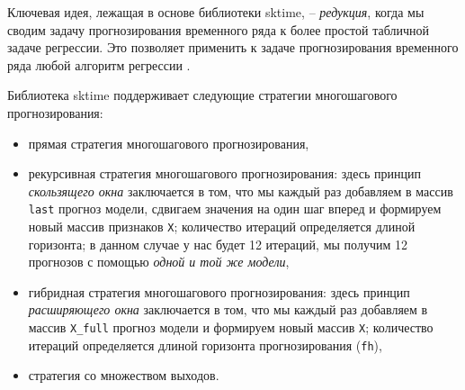 \documentclass[%
	11pt,
	a4paper,
	utf8,
		]{article}
\begin{document}
Ключевая идея, лежащая в основе библиотеки sktime, -- \emph{редукция}, когда мы сводим задачу прогнозирования временного ряда к более простой табличной задаче регрессии. Это позволяет применить к задаче прогнозирования временного ряда любой алгоритм регрессии \cite[]{gruzdev:time-series-2022}.

Библиотека sktime поддерживает следующие стратегии многошагового прогнозирования:
\begin{itemize}
	\item прямая стратегия многошагового прогнозирования,
	
	\item рекурсивная стратегия многошагового прогнозирования: здесь принцип \emph{скользящего окна} заключается в том, что мы каждый раз добавляем в массив \verb|last| прогноз модели, сдвигаем значения на один шаг вперед и формируем новый массив признаков \verb|X|; количество итераций определяется длиной горизонта; в данном случае у нас будет 12 итераций, мы получим 12 прогнозов с помощью \emph{одной и той же модели}, 
	
	\item гибридная стратегия многошагового прогнозирования: здесь принцип \emph{расширяющего окна} заключается в том, что мы каждый раз добавляем в массив \verb|X_full| прогноз модели и формируем новый массив \verb|X|; количество итераций определяется длиной горизонта прогнозирования (\verb|fh|),
	
	\item стратегия со множеством выходов.
\end{itemize}







\begin{thebibliography}{99}
	
	
\end{thebibliography}


\end{document}
